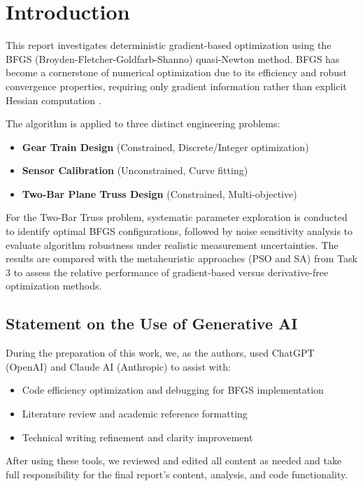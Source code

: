 \section{Introduction}

This report investigates deterministic gradient-based optimization using the BFGS (Broyden-Fletcher-Goldfarb-Shanno) quasi-Newton method. BFGS has become a cornerstone of numerical optimization due to its efficiency and robust convergence properties, requiring only gradient information rather than explicit Hessian computation \cite{fletcher1970, shanno1970, nocedalwright1999}.

The algorithm is applied to three distinct engineering problems:
\begin{itemize}
    \item \textbf{Gear Train Design} (Constrained, Discrete/Integer optimization)
    \item \textbf{Sensor Calibration} (Unconstrained, Curve fitting)
    \item \textbf{Two-Bar Plane Truss Design} (Constrained, Multi-objective)
\end{itemize}

For the Two-Bar Truss problem, systematic parameter exploration is conducted to identify optimal BFGS configurations, followed by noise sensitivity analysis to evaluate algorithm robustness under realistic measurement uncertainties. The results are compared with the metaheuristic approaches (PSO and SA) from Task 3 to assess the relative performance of gradient-based versus derivative-free optimization methods.

\subsection*{Statement on the Use of Generative AI}
During the preparation of this work, we, as the authors, used ChatGPT (OpenAI) and Claude AI (Anthropic) to assist with:
\begin{itemize}
    \item Code efficiency optimization and debugging for BFGS implementation
    \item Literature review and academic reference formatting
    \item Technical writing refinement and clarity improvement
\end{itemize}
After using these tools, we reviewed and edited all content as needed and take full responsibility for the final report's content, analysis, and code functionality.
